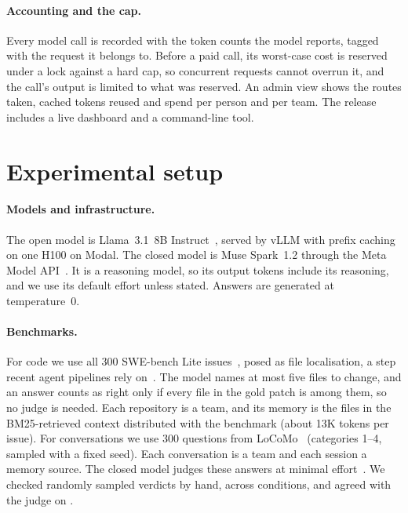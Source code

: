 \documentclass[10pt,twocolumn]{article}
\begin{document}
\paragraph{Accounting and the cap.} Every model call is recorded with the token counts the model reports, tagged with the request it belongs to. Before a paid call, its worst-case cost is reserved under a lock against a hard cap, so concurrent requests cannot overrun it, and the call's output is limited to what was reserved. An admin view shows the routes taken, cached tokens reused and spend per person and per team. The release includes a live dashboard and a command-line tool.

\section{Experimental setup}
\label{sec:setup}

\paragraph{Models and infrastructure.} The open model is Llama~3.1~8B Instruct~\citep{llama3}, served by vLLM with prefix caching on one H100 on Modal. The closed model is Muse Spark~1.2 through the Meta Model API~\citep{metamodelapi}. It is a reasoning model, so its output tokens include its reasoning, and we use its default effort unless stated. Answers are generated at temperature~0.

\paragraph{Benchmarks.} For code we use all 300 SWE-bench Lite issues~\citep{jimenez2024swebench}, posed as file localisation, a step recent agent pipelines rely on~\citep{xia2024agentless}. The model names at most five files to change, and an answer counts as right only if every file in the gold patch is among them, so no judge is needed. Each repository is a team, and its memory is the files in the BM25-retrieved context distributed with the benchmark (about 13K tokens per issue). For conversations we use 300 questions from LoCoMo~\citep{maharana2024locomo} (categories 1--4, sampled with a fixed seed). Each conversation is a team and each session a memory source. The closed model judges these answers at minimal effort~\citep{zheng2023judge}. We checked \handChecked{} randomly sampled verdicts by hand, across conditions, and agreed with the judge on \handAgree.
\end{document}
